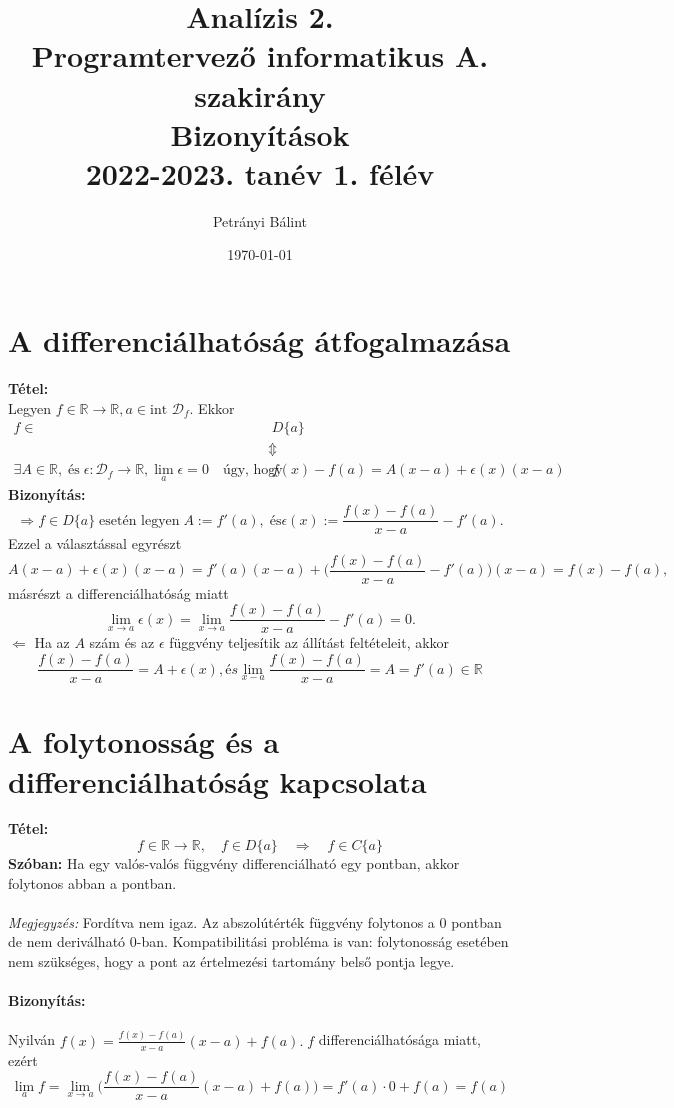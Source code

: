 \documentclass[10pt,a4paper]{article}
\date{\today}
\author{Petrányi Bálint}
\title{%
	\textbf{Analízis 2.} \\
	\textbf{Programtervező informatikus A. szakirány} \\
	\medskip
	Bizonyítások\\
	\large 2022-2023. tanév 1. félév
}
\begin{document}
\maketitle
\tableofcontents
\newpage
\section{A differenciálhatóság átfogalmazása}
\textbf{Tétel:} \\ 
Legyen $f \in \mathbb{R} \rightarrow \mathbb{R}, a \in \text{int } \mathcal{D}_f$. Ekkor
\[
\begin{split}
f \in & \; D\{a\} \\
& \Updownarrow \\
\exists A \in \mathbb{R}, \; \text{és} \; \epsilon : \mathcal{D}_f \rightarrow \mathbb{R}, \lim_a{\epsilon} = 0 \quad \text{úgy, hogy } & \; f(x)- f(a) = A(x-a)+\epsilon (x)(x-a)
\end{split}
\]
\textbf{Bizonyítás:}
\[
\Longrightarrow f \in D\{a\} \; \text{esetén legyen} \; A:=f'(a), \; \text{és} \epsilon (x) := \frac{f(x)-f(a)}{x-a} -f'(a).
\]
Ezzel a választással egyrészt
\[
A(x-a) + \epsilon (x)(x-a) =f'(a)(x-a)+\Big(\frac{f(x)-f(a)}{x-a}-f'(a)\Big)(x-a) =f(x)-f(a),
\]
másrészt a differenciálhatóság miatt
\[
\lim\limits_{x\rightarrow a} \epsilon (x) = \lim\limits_{x\rightarrow a} \frac{f(x)-f(a)}{x-a}-f'(a)=0.
\]
$\Longleftarrow$ Ha az $A$ szám és az $\epsilon$ függvény teljesítik az állítást feltételeit, akkor 
\[
\frac{f(x)-f(a)}{x-a} = A + \epsilon (x), és \lim\limits_{x-a} \frac{f(x)-f(a)}{x-a} = A = f'(a) \in \mathbb{R}
\]
\newpage
\section{A folytonosság és a differenciálhatóság kapcsolata}
\textbf{Tétel:}
\[
f \in \mathbb{R} \rightarrow \mathbb{R}, \quad f \in D\{a\} \quad \Longrightarrow \quad  f \in C\{a\}
\]
\textbf{Szóban:} Ha egy valós-valós függvény differenciálható egy pontban, akkor folytonos abban a pontban. \\ \\
\textit{Megjegyzés:} Fordítva nem igaz. Az abszolútérték függvény folytonos a $0$ pontban de nem deriválható $0$-ban. Kompatibilitási probléma is van: folytonosság esetében nem szükséges, hogy a pont az értelmezési tartomány belső pontja legye. \\ \\
\textbf{Bizonyítás:} \\ \\
Nyilván $f(x)=\frac{f(x)-f(a)}{x-a}(x-a)+f(a). \; f$ differenciálhatósága miatt, ezért
\[
\lim_a f= \lim_{x\rightarrow a } \Big(\frac{f(x)-f(a)}{x-a}(x-a)+f(a)\Big) 	= f'(a)\cdot 0 + f(a)=f(a)
\]
\newpage
\end{document}
